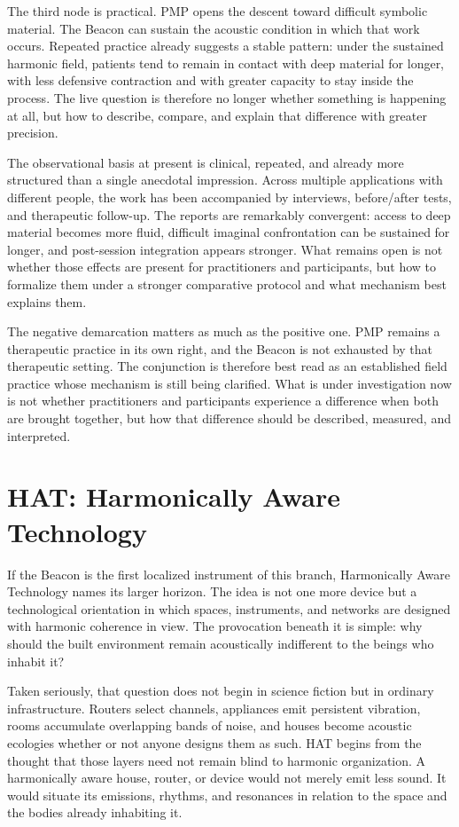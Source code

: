 The third node is practical. PMP opens the descent toward difficult symbolic material. The Beacon can sustain the acoustic condition in which that work occurs. Repeated practice already suggests a stable pattern: under the sustained harmonic field, patients tend to remain in contact with deep material for longer, with less defensive contraction and with greater capacity to stay inside the process. The live question is therefore no longer whether something is happening at all, but how to describe, compare, and explain that difference with greater precision.

The observational basis at present is clinical, repeated, and already more structured than a single anecdotal impression. Across multiple applications with different people, the work has been accompanied by interviews, before/after tests, and therapeutic follow-up. The reports are remarkably convergent: access to deep material becomes more fluid, difficult imaginal confrontation can be sustained for longer, and post-session integration appears stronger. What remains open is not whether those effects are present for practitioners and participants, but how to formalize them under a stronger comparative protocol and what mechanism best explains them.

The negative demarcation matters as much as the positive one. PMP remains a therapeutic practice in its own right, and the Beacon is not exhausted by that therapeutic setting. The conjunction is therefore best read as an established field practice whose mechanism is still being clarified. What is under investigation now is not whether practitioners and participants experience a difference when both are brought together, but how that difference should be described, measured, and interpreted.


\section{HAT: Harmonically Aware Technology}


If the Beacon is the first localized instrument of this branch, Harmonically Aware Technology names its larger horizon. The idea is not one more device but a technological orientation in which spaces, instruments, and networks are designed with harmonic coherence in view. The provocation beneath it is simple: why should the built environment remain acoustically indifferent to the beings who inhabit it?

Taken seriously, that question does not begin in science fiction but in ordinary infrastructure. Routers select channels, appliances emit persistent vibration, rooms accumulate overlapping bands of noise, and houses become acoustic ecologies whether or not anyone designs them as such. HAT begins from the thought that those layers need not remain blind to harmonic organization. A harmonically aware house, router, or device would not merely emit less sound. It would situate its emissions, rhythms, and resonances in relation to the space and the bodies already inhabiting it.

